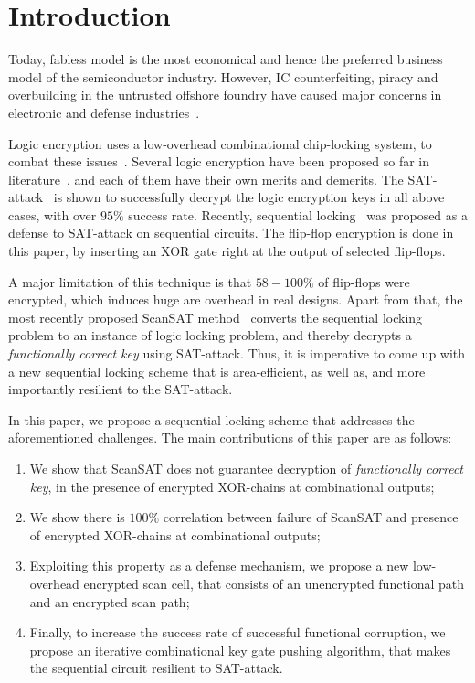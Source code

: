 \section{Introduction}
\label{sec:introduction}
\noindent 
Today, fabless model is the most economical and hence the preferred business model of the semiconductor industry. 
However, IC counterfeiting, piracy and overbuilding in the untrusted offshore foundry have caused major concerns in electronic and defense industries~\cite{pecht06, trimberger07, farinaz:epic}. 

Logic encryption uses a low-overhead combinational chip-locking system, to combat these issues~\cite{farinaz:epic}. 
Several logic encryption have been proposed so far in literature~\cite{farinaz:epic, jv:dac12, jv:tc15, dupuis:iolts14, baumgarten:dandt10}, and each of them have their own merits and demerits. 
The SAT-attack~\cite{pramod:host15} is shown to successfully decrypt the logic encryption keys in all above cases, with over $95 \%$ success rate. 
Recently, sequential locking~\cite{rajit:encryptFF} was proposed as a defense to SAT-attack on sequential circuits. 
The flip-flop encryption is done in this paper, by inserting an XOR gate right at the output of selected flip-flops. 

A major limitation of this technique is that $58-100\%$ of flip-flops were encrypted, which 
induces huge are overhead in real designs. Apart from that, the most recently proposed ScanSAT method~\cite{lilas:aspdac19} 
converts the sequential locking problem to an instance of logic locking problem, and thereby decrypts a {\em functionally correct key} using SAT-attack. 
Thus, it is imperative to come up with a new sequential locking scheme that is area-efficient, as well as, and more importantly resilient to the SAT-attack. 

In this paper, we propose a sequential locking scheme that addresses the aforementioned challenges. The main contributions of this paper are as follows:
\begin{enumerate}
\item We show that ScanSAT does not guarantee decryption of {\em functionally correct key}, in the presence of encrypted XOR-chains at combinational outputs; 
\item We show there is $100\%$ correlation between failure of ScanSAT and presence of encrypted XOR-chains at combinational outputs; 
\item Exploiting this property as a defense mechanism, we propose a new low-overhead encrypted scan cell, that consists of an unencrypted functional path and an encrypted scan path; 
\item Finally, to increase the success rate of successful functional corruption, we propose an iterative combinational key gate pushing algorithm, that makes the sequential circuit resilient to SAT-attack. 
\end{enumerate}

